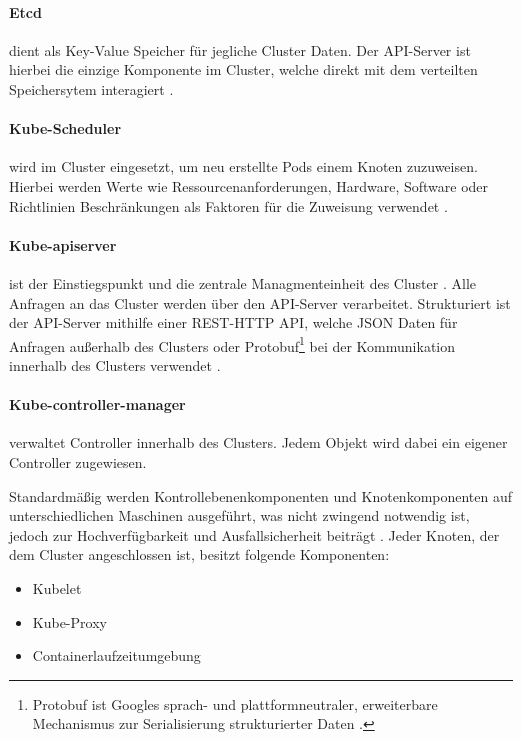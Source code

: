 \paragraph{Etcd} dient als Key-Value Speicher für jegliche Cluster Daten.
Der API-Server ist hierbei die einzige Komponente im Cluster, welche direkt mit dem verteilten Speichersytem interagiert \cite{Hausenblas2019}.

\paragraph{Kube-Scheduler} wird im Cluster eingesetzt, um neu erstellte Pods einem Knoten zuzuweisen.
Hierbei werden Werte wie Ressourcenanforderungen, Hardware, Software oder Richtlinien Beschränkungen 
als Faktoren für die Zuweisung verwendet \cite{kubernetesComponents}.

\paragraph{Kube-apiserver} ist der Einstiegspunkt und die zentrale Managmenteinheit des Cluster \cite{Hausenblas2019}. 
Alle Anfragen an das Cluster werden über den API-Server verarbeitet.
Strukturiert ist der API-Server mithilfe einer REST-HTTP API, welche JSON Daten für Anfragen außerhalb des Clusters
oder Protobuf\footnote{Protobuf ist Googles sprach- und plattformneutraler, erweiterbare Mechanismus zur Serialisierung strukturierter Daten \cite{protobuf}.}
bei der Kommunikation innerhalb des Clusters verwendet \cite{Hausenblas2019}.

\paragraph{Kube-controller-manager} verwaltet Controller innerhalb des Clusters.
Jedem Objekt wird dabei ein eigener Controller zugewiesen.

\vspace{5mm}
Standardmäßig werden Kontrollebenenkomponenten und Knotenkomponenten auf unterschiedlichen Maschinen ausgeführt,
was nicht zwingend notwendig ist, jedoch zur Hochverfügbarkeit und Ausfallsicherheit beiträgt \cite{kubernetesComponents}. 
Jeder Knoten, der dem Cluster angeschlossen ist, besitzt folgende Komponenten:
\begin{itemize}
  \item Kubelet
  \item Kube-Proxy
  \item Containerlaufzeitumgebung
\end{itemize}

